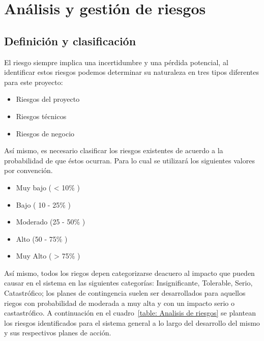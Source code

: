 \section{Análisis y gestión de riesgos}
  \subsection{Definición y clasificación}
    El riesgo siempre implica una incertidumbre y una pérdida potencial, al identificar estos riesgos podemos determinar su naturaleza en tres tipos diferentes para este proyecto:
    \begin{itemize}
      \item Riesgos del proyecto
      \item Riesgos técnicos
      \item Riesgos de negocio
    \end{itemize}
    Así mismo, es necesario clasificar los riesgos existentes de acuerdo  a la probabilidad de que éstos ocurran. Para lo cual se utilizará los siguientes valores por convención.
    \begin{itemize}
      \item Muy bajo ( < 10\% )
      \item Bajo ( 10 - 25\% )
      \item Moderado (25 - 50\% )
      \item Alto (50 - 75\% )
      \item Muy Alto ( > 75\% )
    \end{itemize}
    Así mismo, todos los riegos depen categorizarse deacuero al impacto que pueden causar en el sistema en las siguientes categorías: Insignificante, Tolerable, Serio, Catastrófico; los planes de contingencia suelen ser desarrollados para aquellos riegos con probabilidad de moderada a muy alta y con un impacto serio o castastrófico.
    A continuación en el cuadro~\ref{table: Analisis de riesgos} se plantean los riesgos identificados para el sistema general a lo largo del desarrollo del mismo y sus respectivos planes de acción.
    \newpage

